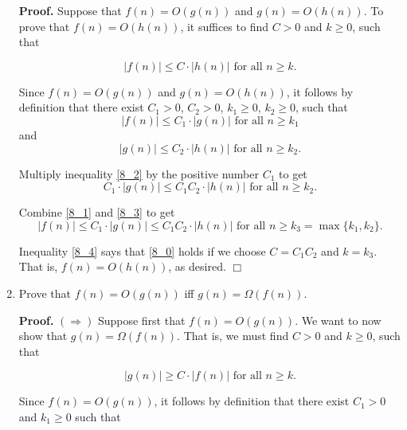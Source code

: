 \documentclass[9pt]{article}
\newcommand{\qed}{\hfill \ensuremath{\Box}}
\begin{document}
\begin{enumerate}
      \textbf{Proof.} Suppose that $f(n) = O(g(n))$ and $g(n) = O(h(n))$. To
      prove that ${f(n) = O(h(n))}$, it suffices to find $C > 0$ and $k \ge 0$,
      such that

      \begin{equation} \label{8_0}
         |f(n)| \le C \cdot |h(n)| \text{ for all } n \ge k.
      \end{equation}

      Since
      $f(n) = O(g(n))$ and $g(n) = O(h(n))$, it follows by definition that there
      exist $C_1 > 0$, $C_2 > 0$, $k_1 \ge 0$, $k_2 \ge 0$, such that
      \begin{equation} \label{8_1}
         |f(n)| \le C_1 \cdot |g(n)| \text{ for all } n \ge k_1
      \end{equation}
       and
      \begin{equation} \label{8_2}
         |g(n)| \le C_2 \cdot |h(n)| \text{ for all } n \ge k_2.
      \end{equation}

      Multiply inequality \eqref{8_2} by the positive number $C_1$ to get
      \begin{equation} \label{8_3}
         C_1 \cdot |g(n)| \le C_1C_2 \cdot |h(n)| \text{ for all } n \ge k_2.
      \end{equation}
      
      Combine \eqref{8_1} and \eqref{8_3} to get
      \begin{equation} \label{8_4}
         |f(n)| \le C_1 \cdot |g(n)| \le C_1C_2 \cdot |h(n)| \text{ for all }
         n \ge k_3 = \max\{k_1, k_2\}.
      \end{equation}

      Inequality \eqref{8_4} says that \eqref{8_0} holds if we choose
      $C = C_1C_2$ and $k = k_3$. That is, ${f(n) = O(h(n))}$, as desired. \qed
   \item Prove that $f(n) = O(g(n))$ iff $g(n) = \Omega(f(n))$.

      \textbf{Proof.} $(\Rightarrow)$ Suppose first that $f(n) = O(g(n))$. We
      want to now show that ${g(n) = \Omega(f(n))}$. That is, we must find
      $C > 0$ and $k \ge 0$, such that

      \begin{equation} \label{9_1}
         |g(n)| \ge C \cdot |f(n)| \text{ for all } n \ge k.
      \end{equation}

      Since $f(n) = O(g(n))$, it follows by definition that there exist
      $C_1 > 0$ and $k_1 \ge 0$ such that 


\end{enumerate}
\end{document}
